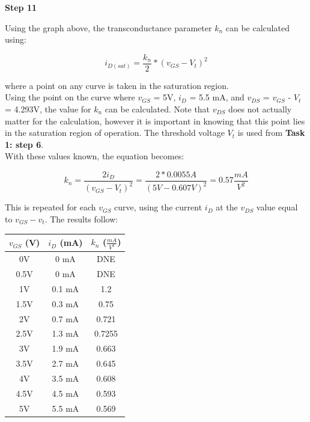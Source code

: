 \documentclass[notitlepage, 12pt]{report}  %
\begin{document}
\textbf{Step 11}

Using the graph above, the transconductance parameter $k_n$ can be calculated using:

\begin{equation}
    i_{D(sat)} = \frac{k_n}{2} * (v_{GS} - V_t)^2
\end{equation}

where a point on any curve is taken in the saturation region. \\

Using the point on the curve where $v_{GS}$ = 5V, $i_D$ = 5.5 mA, and $v_{DS}$ = $v_{GS}$ - $V_t$ = 4.293V, the value for $k_n$ can be calculated. 
Note that $v_{DS}$ does not actually matter for the calculation, however it is important in knowing that this point 
lies in the saturation region of operation. The threshold voltage $V_t$ is used from \textbf{Task 1: step 6}. \\

With these values known, the equation becomes:

\begin{equation}
    k_n = \frac{2 i_D}{(v_{GS} - V_t)^2} = \frac{2 * 0.0055 A}{(5V - 0.607V)^2} = 0.57 \frac{mA}{V^2}
\end{equation}

This is repeated for each $v_{GS}$ curve, using the current $i_D$ at the $v_{DS}$ value equal to $v_{GS} - v_t$. The results follow:

\begin{table}[h!]
    \begin{center}
        \begin{tabular}{c|c|c}
            $v_{GS}$ (V) & $i_D$ (mA)& $k_n$ ($\frac{mA}{V^2}$) \\
            \hline
            0V           & 0 mA   & DNE    \\
            0.5V         & 0 mA   & DNE    \\
            1V           & 0.1 mA & 1.2    \\
            1.5V         & 0.3 mA & 0.75   \\
            2V           & 0.7 mA & 0.721  \\
            2.5V         & 1.3 mA & 0.7255 \\
            3V           & 1.9 mA & 0.663  \\
            3.5V         & 2.7 mA & 0.645  \\
            4V           & 3.5 mA & 0.608  \\
            4.5V         & 4.5 mA & 0.593  \\
            5V           & 5.5 mA & 0.569 
        \end{tabular}
    \end{center}
\end{table}
\end{document}
